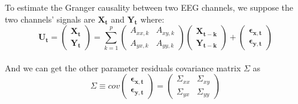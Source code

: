 To estimate the Granger causality between two EEG channels, we suppose the two channels' signals are $\mathbf{X_t}$ and $\mathbf{Y_t}$ where:
\begin{equation}
\mathbf{U_t} =  \begin{pmatrix}
                  \mathbf{X_t}\\
                  \mathbf{Y_t}
                \end{pmatrix} = \sum_{k=1}^{p} \begin{pmatrix}
                                                  A_{xx,k} & A_{xy,k}\\
                                                  A_{yx,k} & A_{yy,k}
                                                \end{pmatrix} \begin{pmatrix}
                                                              \mathbf{X_{t-k}}\\
                                                              \mathbf{Y_{t-k}}
                                                                    \end{pmatrix} + \begin{pmatrix}
                                                                                      \mathbf{\epsilon_{x,t}}\\
                                                                                      \mathbf{\epsilon_{y,t}}
                                                                                    \end{pmatrix}
\end{equation}
\\
And we can get the other parameter residuals covariance matrix $\Sigma$ as
\begin{equation}
\Sigma \equiv cov \begin{pmatrix}
                   \mathbf{\epsilon_{x,t}}\\                                                                             \mathbf{\epsilon_{y,t}}
                  \end{pmatrix} = \begin{pmatrix}
                                   \Sigma_{xx} & \Sigma_{xy}\\                                                                           \Sigma_{yx} & \Sigma_{yy}
                                  \end{pmatrix}
\end{equation}

